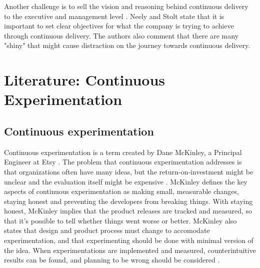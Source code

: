 \documentclass[english]{tktltiki2}
\theoremstyle{definition}
\theoremstyle{remark}
\begin{document}
Another challenge is to sell the vision and reasoning behind continuous delivery to the executive and management level \cite{neely2013continuous}. Neely and Stolt state that it is important to set clear objectives for what the company is trying to achieve through continuous delivery. The authors also comment that there are many "shiny" that might cause distraction on the journey towards continuous delivery. 



\section{Literature: Continuous Experimentation}

\subsection{Continuous experimentation}

Continuous experimentation is a term created by Dane McKinley, a Principal Engineer at Etsy \cite{mcfunley}. The problem that continuous experimentation addresses is that organizations often have many ideas, but the return-on-investment might be unclear and the evaluation itself might be expensive \cite{kohavi2007practical}. McKinley defines the key aspects of continuous experimentation as making small, measurable changes, staying honest and preventing the developers from breaking things. With staying honest, McKinley implies that the product releases are tracked and measured, so that it's possible to tell whether things went worse or better. McKinley also states that design and product process must change to accomodate experimentation, and that experimenting should be done with minimal version of the idea. When experimentations are implemented and measured, counterintuitive results can be found, and planning to be wrong should be considered \cite{mcfunley}. 
\end{document}
